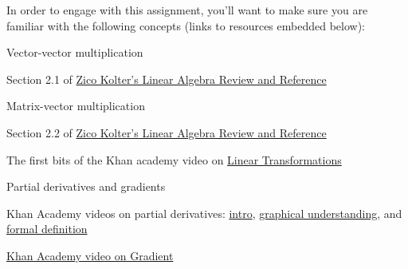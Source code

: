 \documentclass[assignment01_Solutions]{subfiles}
\begin{document}
\begin{externalresources}[(60 minutes)]
In order to engage with this assignment, you'll want to make sure you are familiar with the following concepts (links to resources embedded below):
\bi
\item Vector-vector multiplication
\bi
\item Section 2.1 of \href{https://see.stanford.edu/materials/aimlcs229/cs229-linalg.pdf}{Zico Kolter's Linear Algebra Review and Reference}
\ei
\item Matrix-vector multiplication
\bi
\item Section 2.2 of \href{https://see.stanford.edu/materials/aimlcs229/cs229-linalg.pdf}{Zico Kolter's Linear Algebra Review and Reference}
\item The first bits of the Khan academy video on \href{https://www.khanacademy.org/math/linear-algebra/matrix-transformations/linear-transformations/v/matrix-vector-products-as-linear-transformations}{Linear Transformations}
\ei
\item Partial derivatives and gradients
\bi
\item Khan Academy videos on partial derivatives: \href{https://www.khanacademy.org/math/multivariable-calculus/multivariable-derivatives/partial-derivatives/v/partial-derivatives-introduction}{intro}, \href{https://www.khanacademy.org/math/multivariable-calculus/multivariable-derivatives/partial-derivatives/v/partial-derivatives-and-graphs}{graphical understanding}, and \href{https://www.khanacademy.org/math/multivariable-calculus/multivariable-derivatives/partial-derivatives/v/formal-definition-of-partial-derivatives}{formal definition}
\item \href{https://www.khanacademy.org/math/multivariable-calculus/multivariable-derivatives/gradient-and-directional-derivatives/v/gradient}{Khan Academy video on Gradient}
\ei
\ei
\end{externalresources}
\end{document}
